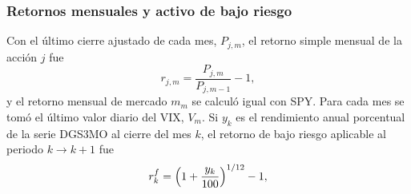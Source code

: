 \subsubsection{Retornos mensuales y activo de bajo riesgo}

Con el último cierre ajustado de cada mes, $P_{j,m}$, el retorno simple mensual de la acción $j$ fue
\begin{equation}\label{eq:ret}
r_{j,m}=\frac{P_{j,m}}{P_{j,m-1}}-1,
\end{equation}
y el retorno mensual de mercado $m_m$ se calculó igual con SPY. Para cada mes se tomó el último valor diario del VIX, $V_m$. Si $y_k$ es el rendimiento anual porcentual de la serie DGS3MO al cierre del mes $k$, el retorno de bajo riesgo aplicable al periodo $k\to k+1$ fue
\begin{equation}\label{eq:rf}
r^f_k=\Bigl(1+\frac{y_k}{100}\Bigr)^{1/12}-1,
\end{equation}

